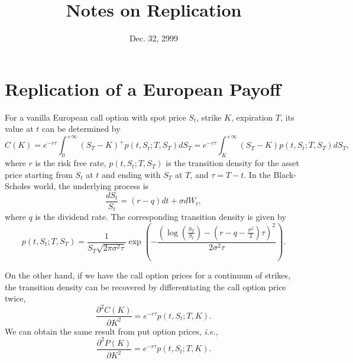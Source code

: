 \documentclass[12pt]{article}
\begin{document}
\title{Notes on Replication}
\date{Dec. 32, 2999}

\maketitle

\section{Replication of a European Payoff}

  For a vanilla European call option with spot price $S_t$, strike $K$, expiration $T$, its value at $t$ can be determined by
  \begin{equation}
    C(K) = e^{-r\tau}\int_{0}^{+\infty}(S_T-K)^+p(t,S_t;T,S_T)dS_T = e^{-r\tau}\int_{K}^{+\infty}(S_T-K)p(t,S_t;T,S_T)dS_T,
  \end{equation}
  where $r$ is the risk free rate, $p(t,S_t;T,S_T)$ is the transition density for the asset price starting from $S_t$ at $t$ and
  ending with $S_T$ at $T$, and $\tau=T-t$. In the Black-Scholes world, the underlying process is
  \begin{equation}
    \frac{dS_t}{S_t}=(r-q)dt+\sigma dW_t,
    \label{BS}
  \end{equation}
  where $q$ is the dividend rate. The corresponding transition density is given by
  \begin{equation}
    p(t,S_t;T,S_T)=\frac{1}{S_T\sqrt{2\pi\sigma^2\tau}}
    \exp\left(-\frac{\displaystyle \left(\log\left(\frac{S_T}{S_t}\right)-\left(r-q-\frac{\sigma^2}{2}\right)\tau\right)^2}{2\sigma^2\tau}\right).
    \label{density}
  \end{equation}

  On the other hand, if we have the call option prices for a continuum of strikes, the transition density can be recovered by
  differentiating the call option price twice,
  \begin{equation}
    \frac{\partial^2C(K)}{\partial K^2}=e^{-r\tau}p(t,S_t;T,K).
    \label{call}
  \end{equation}
  We can obtain the same result from put option prices, {\it i.e.},
  \begin{equation}
    \frac{\partial^2P(K)}{\partial K^2}=e^{-r\tau}p(t,S_t;T,K).
    \label{put}
  \end{equation}
\end{document}

